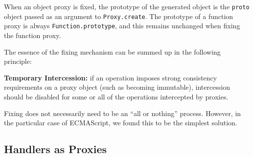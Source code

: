 \documentclass{sig-alternate}
\begin{document}
When an object proxy is fixed, the prototype of the generated object is the \texttt{proto} object passed as an argument to \texttt{Proxy.create}. The prototype of a function proxy is always \texttt{Function.prototype}, and this remains unchanged when fixing the function proxy.

The essence of the fixing mechanism can be summed up in the following principle:

\textbf{Temporary Intercession:} if an operation imposes strong consistency requirements on a proxy object (such as becoming immutable), intercession should be disabled for some or all of the operations intercepted by proxies.

Fixing does not necessarily need to be an ``all or nothing'' process. However, in the particular case of ECMAScript, we found this to be the simplest solution.


%
%
%

\subsection{Handlers as Proxies}
\label{sub:doublelifting}
\end{document}
